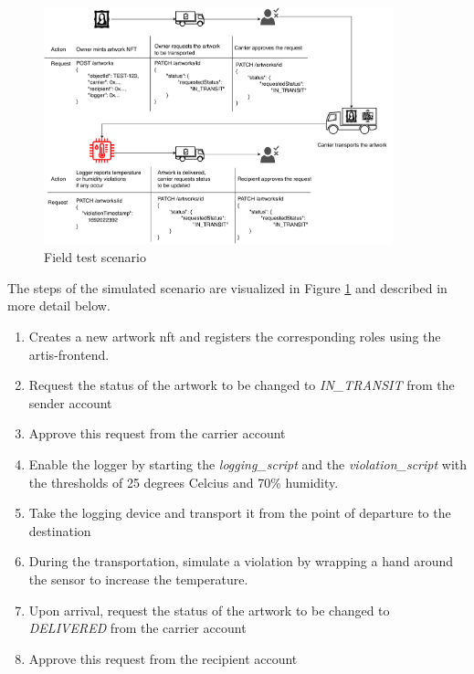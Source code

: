 \begin{figure}[ht]
    \centering
    \includegraphics[width=0.9\textwidth]{diagrams/evaluation_scenario_v2.drawio.pdf}
    \caption{Field test scenario}
    \label{fig:eval_scenario}
\end{figure}

The steps of the simulated scenario are visualized in Figure \ref{fig:eval_scenario} and described in more detail below.

\begin{enumerate}
    \item Creates a new artwork \gls{nft} and registers the corresponding roles using the artis-frontend.
    \item Request the status of the artwork to be changed to \textit{IN\_TRANSIT} from the sender account
    \item Approve this request from the carrier account
    \item Enable the logger by starting the \textit{logging\_script} and the \textit{violation\_script} with the thresholds of 25 degrees Celcius and 70\% humidity.
    \item Take the logging device and transport it from the point of departure to the destination
    \item During the transportation, simulate a violation by wrapping a hand around the sensor to increase the temperature.
    \item Upon arrival, request the status of the artwork to be changed to \textit{DELIVERED} from the carrier account
    \item Approve this request from the recipient account
\end{enumerate}

